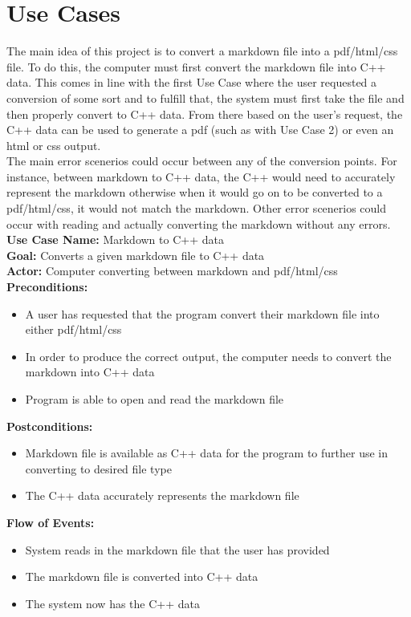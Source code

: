 
\section{Use Cases}

The main idea of this project is to convert a markdown file into a pdf/html/css file. To do this, the computer must first convert the markdown file into C++ data. This comes in line with the first Use Case where the user requested a conversion of some sort and to fulfill that, the system must first take the file and then properly convert to C++ data. From there based on the user's request, the C++ data can be used to generate a pdf (such as with Use Case 2) or even an html or css output. \\
The main error scenerios could occur between any of the conversion points. For instance, between markdown to C++ data, the C++ would need to accurately represent the markdown otherwise when it would go on to be converted to a pdf/html/css, it would not match the markdown. Other error scenerios could occur with reading and actually converting the markdown without any errors. \\
\textbf{Use Case Name:} Markdown to C++ data  
\\
\textbf{Goal:} Converts a given markdown file to C++ data
\\
\textbf{Actor:} Computer converting between markdown and pdf/html/css 
\\
\textbf{Preconditions:} 
\begin{itemize}
\item A user has requested that the program convert their markdown file into either pdf/html/css 
\item In order to produce the correct output, the computer needs to convert the markdown into C++ data 
\item Program is able to open and read the markdown file
\end{itemize}
\textbf{Postconditions:} 
\begin{itemize}
\item Markdown file is available as C++ data for the program to further use in converting to desired file type  
\item The C++ data accurately represents the markdown file
\end{itemize}
\textbf{Flow of Events:} 
\begin{itemize}
\item System reads in the markdown file that the user has provided 
\item The markdown file is converted into C++ data 
\item The system now has the C++ data 
\end{itemize}
